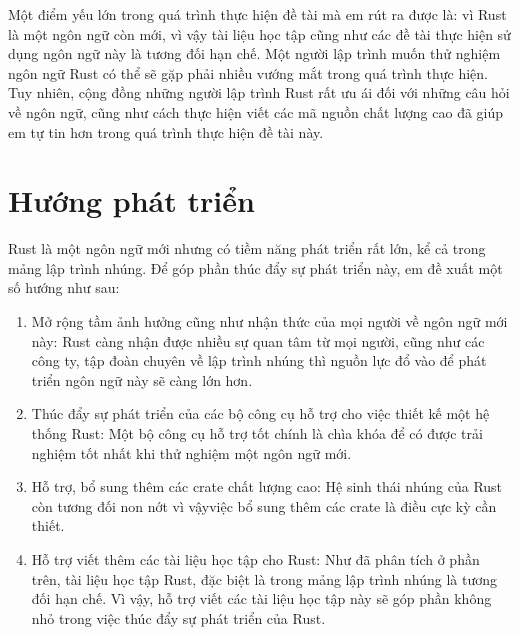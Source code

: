Một điểm yếu lớn trong quá trình thực hiện đề tài mà em rút ra được là: vì Rust là một ngôn ngữ còn mới, vì vậy tài liệu học tập cũng như các đề tài thực hiện sử dụng ngôn ngữ này là tương đối hạn chế.
Một người lập trình muốn thử nghiệm ngôn ngữ Rust có thể sẽ gặp phải nhiều vướng mắt trong quá trình thực hiện.
Tuy nhiên, cộng đồng những người lập trình Rust rất ưu ái đối với những câu hỏi về ngôn ngữ, cũng như cách thực hiện viết các mã nguồn chất lượng cao đã giúp em tự tin hơn trong quá trình thực hiện đề tài này.

\section{Hướng phát triển}
Rust là một ngôn ngữ mới nhưng có tiềm năng phát triển rất lớn, kể cả trong mảng lập trình nhúng.
Để góp phần thúc đẩy sự phát triển này, em đề xuất một số hướng như sau:
\begin{enumerate}
    \item Mở rộng tầm ảnh hưởng cũng như nhận thức của mọi người về ngôn ngữ mới này:
        Rust càng nhận được nhiều sự quan tâm từ mọi người, cũng như các công ty, tập đoàn chuyên về lập trình nhúng thì nguồn lực đổ vào để phát triển ngôn ngữ này sẽ càng lớn hơn.
    \item Thúc đẩy sự phát triển của các bộ công cụ hỗ trợ cho việc thiết kế một hệ thống Rust:
        Một bộ công cụ hỗ trợ tốt chính là chìa khóa để có được trải nghiệm tốt nhất khi thử nghiệm một ngôn ngữ mới.
    \item Hỗ trợ, bổ sung thêm các crate chất lượng cao:
        Hệ sinh thái nhúng của Rust còn tương đối non nớt vì vậyviệc bổ sung thêm các crate là điều cực kỳ cần thiết.
    \item Hỗ trợ viết thêm các tài liệu học tập cho Rust:
        Như đã phân tích ở phần trên, tài liệu học tập Rust, đặc biệt là trong mảng lập trình nhúng là tương đối hạn chế.
        Vì vậy, hỗ trợ viết các tài liệu học tập này sẽ góp phần không nhỏ trong việc thúc đẩy sự phát triển của Rust.
\end{enumerate}
